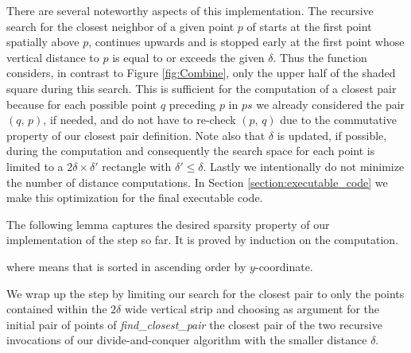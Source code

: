 \begin{isabellebody}
\begin{isamarkuptext}
There are several noteworthy aspects of this implementation. The recursive search for the closest neighbor
of a given point $p$ of  starts at the first point spatially above $p$, continues upwards and
is stopped early at the first point whose vertical distance to $p$ is equal to or exceeds the given $\delta$. Thus the function
considers, in contrast to Figure \ref{fig:Combine}, only the upper half of the shaded square during this search.
This is sufficient for the computation of a closest pair because for each possible point $q$ preceding $p$ in
$\mathit{ps}$ we already considered the pair $(q,\,p)$, if needed, and do not have to re-check $(p,\,q)$ due to the
commutative property of our closest pair definition. Note also that $\delta$ is updated, if possible,
during the computation and consequently the search space for each point is limited to a $2\delta \times \delta'$
rectangle with $\delta' \le \delta$. Lastly we intentionally do not minimize the number of distance computations.
In Section \ref{section:executable_code} we make this optimization for the final executable code.

The following lemma captures the desired sparsity property of our implementation of the  step so far. It is proved by induction on the computation.

\begin{lemma} \label{lemma:find_closest_pair_dist}
 \vskip 0pt
\end{lemma}
where  means that  is sorted in ascending order by $y$-coordinate.

We wrap up the  step by limiting our search for the closest pair to only the points contained within the
$2\delta$ wide vertical strip and choosing as argument for the initial pair of points of \textit{find\_closest\_pair}
the closest pair of the two recursive invocations of our divide-and-conquer algorithm with the smaller distance $\delta$.


\end{isamarkuptext}
\end{isabellebody}

